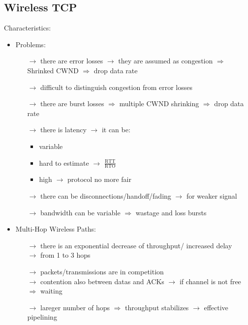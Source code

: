 \subsection{Wireless TCP}
Characteristics:
\begin{itemize}
    \item Problems:
    \begin{itemize}
        \item[$\rightarrow$] there are error losses $\rightarrow$ they are assumed
        as congestion $\Rightarrow$ Shrinked CWND $\Rightarrow$ drop data rate
        \item[$\rightarrow$] difficult to distinguish congestion from error losses
        \item[$\rightarrow$] there are burst losses $\Rightarrow$ multiple CWND
        shrinking $\Rightarrow$ drop data rate
        \item[$\rightarrow$] there is latency $\rightarrow$ it can be:
        \begin{itemize}
            \item variable
            \item hard to estimate $\rightarrow$ $\frac{\text{RTT}}{\text{RTO}}$
            \item high $\rightarrow$ protocol no more fair
        \end{itemize}
        \item[$\rightarrow$] there can be disconnections/handoff/fading $\rightarrow$
        for weaker signal
        \item[$\rightarrow$] bandwidth can be variable $\Rightarrow$ wastage and loss bursts
    \end{itemize}
    \item Multi-Hop Wireless Paths:
    \begin{itemize}
        \item[$\rightarrow$] there is an exponential decrease of throughput/ increased delay\\
        $\rightarrow$ from 1 to 3 hops
        \item[$\rightarrow$] packets/transmissions are in competition\\
        $\rightarrow$ contention also between datas and ACKs $\rightarrow$ if channel is
        not free\\$\Rightarrow$ waiting
        \item[$\rightarrow$] lareger number of hops $\Rightarrow$ throughput stabilizes
        $\rightarrow$ effective pipelining 
    \end{itemize}

\end{itemize}

